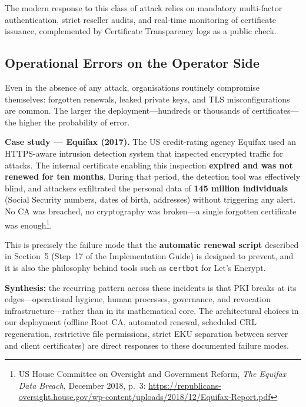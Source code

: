 \documentclass[10pt,twocolumn]{article}
\newcommand{\IGbase}{https://github.com/willLeckyThom/NetworkSecurity/blob/main/Projet/certificate_chain.md}
\newif\ifIGhref
\newcommand{\IGstep}[2]{\ifIGhref\href{\IGbase\##1}{#2}\else#2\fi}%
\begin{document}
The modern response to this class of attack relies on mandatory multi-factor
authentication, strict reseller audits, and real-time monitoring of
certificate issuance, complemented by Certificate Transparency logs as a
public check.

\subsection{Operational Errors on the Operator Side}

Even in the absence of any attack, organisations routinely compromise
themselves: forgotten renewals, leaked private keys, and TLS
misconfigurations are common. The larger the deployment---hundreds or
thousands of certificates---the higher the probability of error.

\textbf{Case study --- Equifax (2017).} The US credit-rating agency Equifax
used an HTTPS-aware intrusion detection system that inspected encrypted
traffic for attacks. The internal certificate enabling this inspection
\textbf{expired and was not renewed for ten months}. During that period,
the detection tool was effectively blind, and attackers exfiltrated the
personal data of \textbf{145 million individuals} (Social Security numbers,
dates of birth, addresses) without triggering any alert. No CA was
breached, no cryptography was broken---a single forgotten certificate was
enough\footnote{US House Committee on Oversight and Government Reform, \textit{The Equifax Data Breach}, December 2018, p.~3: \url{https://republicans-oversight.house.gov/wp-content/uploads/2018/12/Equifax-Report.pdf}}.

This is precisely the failure mode that the \textbf{automatic renewal
script} described in Section~5
(\IGstep{step-17-create-the-renewal-script}{Step~17 of the Implementation
Guide}) is designed to prevent, and it is also the philosophy behind tools
such as \texttt{certbot} for Let's Encrypt.

\begin{alertbox}
\footnotesize\textbf{Synthesis:} the recurring pattern across these
incidents is that PKI breaks at its edges---operational hygiene, human
processes, governance, and revocation infrastructure---rather than in its
mathematical core. The architectural choices in our deployment (offline
Root CA, automated renewal, scheduled CRL regeneration, restrictive file
permissions, strict EKU separation between server and client certificates)
are direct responses to these documented failure modes.
\end{alertbox}
\end{document}
